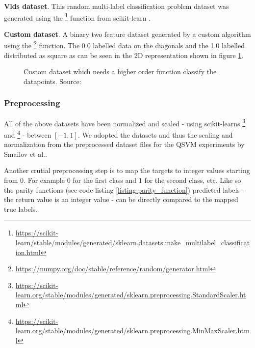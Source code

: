 \textbf{Vlds dataset}. This random multi-label classification problem dataset was generated using the \footnote{\url{https://scikit-learn/stable/modules/generated/sklearn.datasets.make_multilabel_classification.html}} function from scikit-learn\cite{scikit-learn} \cite{SklearnDatasetsMake}.

\textbf{Custom dataset}. A binary two feature dataset generated by a custom algorithm using the \footnote{\url{https://numpy.org/doc/stable/reference/random/generator.html}} function. The 0.0 labelled data on the diagonals and the 1.0 labelled distributed as square as can be seen in the 2D representation shown in figure \ref{figure:custom_dataset}. 

\begin{figure}[!ht]
    \centering
    \caption{Custom dataset which needs a higher order function classify the datapoints. Source: \cite{smailovQuantumMachineLearning2021}}
    \label{figure:custom_dataset}
\end{figure}



\subsubsection{Preprocessing}
All of the above datasets have been normalized and scaled - using scikit-learns  \footnote{\url{https://scikit-learn.org/stable/modules/generated/sklearn.preprocessing.StandardScaler.html}} and \footnote{\url{https://scikit-learn.org/stable/modules/generated/sklearn.preprocessing.MinMaxScaler.html}} - between $[-1, 1]$. We adopted the datasets and thus the scaling and normalization from the preprocessed dataset files for the QSVM experiments by Smailov et al.\cite{smailovQuantumMachineLearning2021}.

Another crutial preprocessing step is to map the targets to integer values starting from $0$. For example $0$ for the first class and $1$ for the second class, etc. Like so the parity functions (see code listing \ref{listing:parity_function}) predicted labels - the return value is an integer value - can be directly compared to the mapped true labels.

